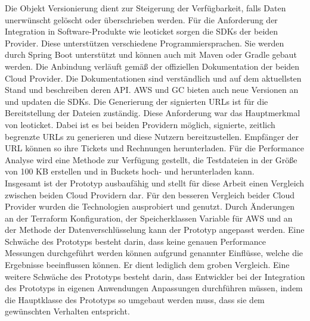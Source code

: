 Die Objekt Versionierung dient zur Steigerung der Verfügbarkeit, falls Daten unerwünscht gelöscht oder überschrieben werden. Für die Anforderung der Integration in Software-Produkte wie leoticket sorgen die SDKs der beiden Provider. Diese unterstützen verschiedene Programmiersprachen. Sie werden durch Spring Boot unterstützt und können auch mit Maven oder Gradle gebaut werden. Die Anbindung verläuft gemäß der offiziellen Dokumentation der beiden Cloud Provider. Die Dokumentationen sind verständlich und auf dem aktuellsten Stand und beschreiben deren API. AWS und GC bieten auch neue Versionen an und updaten die SDKs. Die Generierung der signierten URLs ist für die Bereitstellung der Dateien zuständig. Diese Anforderung war das Hauptmerkmal von leoticket. Dabei ist es bei beiden Providern möglich, signierte, zeitlich begrenzte URLs zu generieren und diese Nutzern bereitzustellen. Empfänger der URL können so ihre Tickets und Rechnungen herunterladen. Für die Performance Analyse wird eine Methode zur Verfügung gestellt, die Testdateien in der Größe von 100 KB erstellen und in Buckets hoch- und herunterladen kann.\\

Insgesamt ist der Prototyp ausbaufähig und stellt für diese Arbeit einen Vergleich zwischen beiden Cloud Providern dar. Für den besseren Vergleich beider Cloud Provider wurden die Technologien ausprobiert und genutzt. Durch Änderungen an der Terraform Konfiguration, der Speicherklassen Variable für AWS und an der Methode der Datenverschlüsselung kann der Prototyp angepasst werden. Eine Schwäche des Prototyps besteht darin, dass keine genauen Performance Messungen durchgeführt werden können aufgrund genannter Einflüsse, welche die Ergebnisse beeinflussen können. Er dient lediglich dem groben Vergleich. Eine weitere Schwäche des Prototyps besteht darin, dass Entwickler bei der Integration des Prototyps in eigenen Anwendungen Anpassungen durchführen müssen, indem die Hauptklasse des Prototyps so umgebaut werden muss, dass sie dem gewünschten Verhalten entspricht.